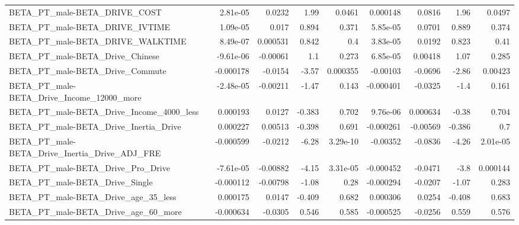 \begin{tabular}{lrrrrrrrr}
BETA\_PT\_male-BETA\_DRIVE\_COST                       &    2.81e-05 &       0.0232 &     1.99 &   0.0461 &   0.000148 &      0.0816 &         1.96 &        0.0497 \\
BETA\_PT\_male-BETA\_DRIVE\_IVTIME                     &    1.09e-05 &        0.017 &    0.894 &    0.371 &   5.85e-05 &      0.0701 &        0.889 &         0.374 \\
BETA\_PT\_male-BETA\_DRIVE\_WALKTIME                   &    8.49e-07 &     0.000531 &    0.842 &      0.4 &   3.83e-05 &      0.0192 &        0.823 &          0.41 \\
BETA\_PT\_male-BETA\_Drive\_Chinese                    &   -9.61e-06 &     -0.00061 &      1.1 &    0.273 &   6.85e-05 &     0.00418 &         1.07 &         0.285 \\
BETA\_PT\_male-BETA\_Drive\_Commute                    &   -0.000178 &      -0.0154 &    -3.57 & 0.000355 &   -0.00103 &     -0.0696 &        -2.86 &       0.00423 \\
BETA\_PT\_male-BETA\_Drive\_Income\_12000\_more          &   -2.48e-05 &     -0.00211 &    -1.47 &    0.143 &  -0.000401 &     -0.0325 &         -1.4 &         0.161 \\
BETA\_PT\_male-BETA\_Drive\_Income\_4000\_less           &    0.000193 &       0.0127 &   -0.383 &    0.702 &   9.76e-06 &    0.000634 &        -0.38 &         0.704 \\
BETA\_PT\_male-BETA\_Drive\_Inertia\_Drive              &    0.000227 &      0.00513 &   -0.398 &    0.691 &  -0.000261 &    -0.00569 &       -0.386 &           0.7 \\
BETA\_PT\_male-BETA\_Drive\_Inertia\_Drive\_ADJ\_FRE      &   -0.000599 &      -0.0212 &    -6.28 & 3.29e-10 &   -0.00352 &     -0.0836 &        -4.26 &      2.01e-05 \\
BETA\_PT\_male-BETA\_Drive\_Pro\_Drive                  &   -7.61e-05 &     -0.00882 &    -4.15 & 3.31e-05 &  -0.000452 &     -0.0471 &         -3.8 &      0.000144 \\
BETA\_PT\_male-BETA\_Drive\_Single                     &   -0.000112 &     -0.00798 &    -1.08 &     0.28 &  -0.000294 &     -0.0207 &        -1.07 &         0.283 \\
BETA\_PT\_male-BETA\_Drive\_age\_35\_less                &    0.000175 &       0.0147 &   -0.409 &    0.682 &   0.000306 &      0.0254 &       -0.408 &         0.683 \\
BETA\_PT\_male-BETA\_Drive\_age\_60\_more                &   -0.000634 &      -0.0305 &    0.546 &    0.585 &  -0.000525 &     -0.0256 &        0.559 &         0.576 \\

\end{tabular}
